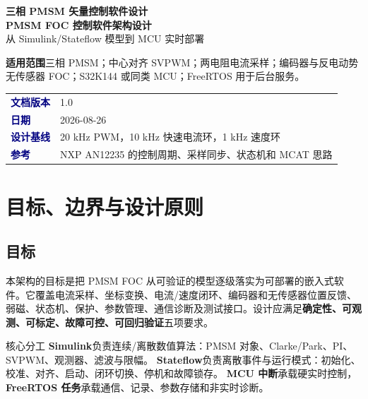 \documentclass[UTF8,a4paper,11pt,fontset=windows]{ctexart}
\begin{document}
\begin{titlepage}
\thispagestyle{empty}
\vspace*{1.25cm}
{\color{white}\Large\bfseries 三相 PMSM 矢量控制软件设计}\\[0.35cm]
{\color{white}\fontsize{26}{31}\selectfont\bfseries PMSM FOC 控制软件架构设计}\\[0.25cm]
{\color{white!85}\large 从 Simulink/Stateflow 模型到 MCU 实时部署}\\[2.35cm]
\begin{tcolorbox}[colback=white,colframe=grayline,boxrule=0.5pt,arc=2pt,left=10pt,right=10pt,top=9pt,bottom=9pt,width=0.88\textwidth]
\textbf{适用范围}\quad 三相 PMSM；中心对齐 SVPWM；两电阻电流采样；编码器与反电动势无传感器 FOC；S32K144 或同类 MCU；FreeRTOS 用于后台服务。
\end{tcolorbox}
\vfill
\begin{tabular}{@{}ll@{}}
\textcolor{navy}{\bfseries 文档版本} & 1.0 \\
\textcolor{navy}{\bfseries 日期} & 2026-08-26 \\
\textcolor{navy}{\bfseries 设计基线} & 20 kHz PWM，10 kHz 快速电流环，1 kHz 速度环 \\
\textcolor{navy}{\bfseries 参考} & NXP AN12235 的控制周期、采样同步、状态机和 MCAT 思路 \\
\end{tabular}
\vspace*{1.35cm}
\end{titlepage}
\begingroup
\setlength{\parskip}{0pt}
\small
\tableofcontents
\endgroup
\clearpage
\section{目标、边界与设计原则}
\subsection{目标}
本架构的目标是把 PMSM FOC 从可验证的模型逐级落实为可部署的嵌入式软件。它覆盖电流采样、坐标变换、电流/速度闭环、编码器和无传感器位置反馈、弱磁、状态机、保护、参数管理、通信诊断及测试接口。设计应满足\textbf{确定性、可观测、可标定、故障可控、可回归验证}五项要求。
\begin{keybox}{核心分工}
\textbf{Simulink}负责连续/离散数值算法：PMSM 对象、Clarke/Park、PI、SVPWM、观测器、滤波与限幅。\quad
\textbf{Stateflow}负责离散事件与运行模式：初始化、校准、对齐、启动、闭环切换、停机和故障锁存。\quad
\textbf{MCU 中断}承载硬实时控制，\textbf{FreeRTOS 任务}承载通信、记录、参数存储和非实时诊断。
\end{keybox}
\end{document}
